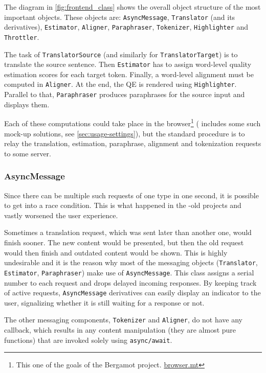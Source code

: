 The diagram in \cref{fig:frontend_class} shows the overall object structure of the most important objects. These objects are: \texttt{AsyncMessage}, \texttt{Translator} (and its derivatives), \texttt{Estimator}, \texttt{Aligner}, \texttt{Paraphraser}, \texttt{Tokenizer}, \texttt{Highlighter} and \texttt{Throttler}. 

The task of \texttt{TranslatorSource} (and similarly for \texttt{TranslatorTarget}) is to translate the source sentence. Then \texttt{Estimator} has to assign word-level quality estimation scores for each target token. Finally, a word-level alignment must be computed in \texttt{Aligner}. At the end, the QE is rendered using \texttt{Highlighter}. Parallel to that, \texttt{Paraphraser} produces paraphrases for the source input and displays them.

Each of these computations could take place in the browser\footnote{This one of the goals of the Bergamot project. \href{https://browser.mt/}{browser.mt}} (\ptakopet{} includes some such mock-up solutions, see \cref{sec:usage-settings}), but the standard procedure is to relay the translation, estimation, paraphrase, alignment and tokenization requests to some server.

\subsubsection*{AsyncMessage}

Since there can be multiple such requests of one type in one second, it is possible to get into a race condition. This is what happened in the \ptakopet{}-old projects and vastly worsened the user experience.

Sometimes a translation request, which was sent later than another one, would finish sooner. The new content would be presented, but then the old request would then finish and outdated content would be shown. This is highly undesirable and it is the reason why most of the messaging objects (\texttt{Translator}, \texttt{Estimator}, \texttt{Paraphraser}) make use of \texttt{AsyncMessage}. This class assigns a serial number to each request and drops delayed incoming responses. By keeping track of active requests, \texttt{AsyncMessage} derivatives can easily display an indicator to the user, signalizing whether it is still waiting for a response or not.

The other messaging components, \texttt{Tokenizer} and \texttt{Aligner}, do not have any callback, which results in any content manipulation (they are almost pure functions) that are invoked solely using \texttt{async/await}.

